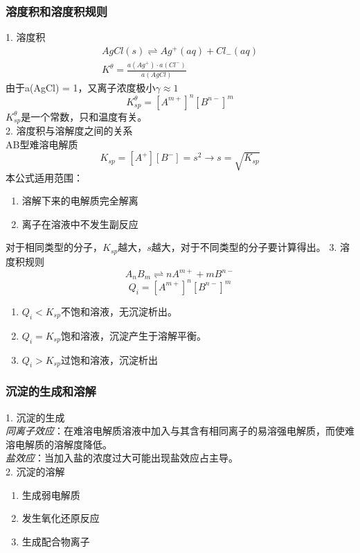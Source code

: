 \documentclass[utf8,a4paper,12pt]{ctexart}
\begin{document}
\subsubsection{溶度积和溶度积规则}
1. 溶度积\\
\begin{gather*}
AgCl(s)\rightleftharpoons Ag^{+}(aq) + Cl_{-}(aq)\\
K^{\theta} = \frac{a(Ag^{+})\cdot a(Cl^{-})}{a(AgCl)}
\end{gather*}
由于a(AgCl) = 1，又离子浓度极小$\gamma \approx 1$
\begin{equation}
K^{\theta}_{sp} = [A^{m+}]^{n}[B^{n-}]^{m}
\end{equation}
$K_{sp}^{\theta}$是一个常数，只和温度有关。\\
2. 溶度积与溶解度之间的关系\\
AB型难溶电解质\\
\[
K_{sp} = [A^{+}][B^{-}] = s^{2} \rightarrow s = \sqrt{K_{sp}}
\]
本公式适用范围：
\begin{enumerate}[1)]
\item 溶解下来的电解质完全解离
\item 离子在溶液中不发生副反应
\end{enumerate}
对于相同类型的分子，$K_{sp}$越大，$s$越大，对于不同类型的分子要计算得出。
3. 溶度积规则
\[
A_{n}B_{m}\rightleftharpoons nA^{m+} + mB^{n-}
\]
\begin{equation}
Q_{i} = [A^{m+}]^{n}[B^{n-}]^{m}
\end{equation}
\begin{enumerate}[(1)]
\item $Q_{i}<K_{sp}$不饱和溶液，无沉淀析出。
\item $Q_{i}=K_{sp}$饱和溶液，沉淀产生于溶解平衡。
\item $Q_{i}>K_{sp}$过饱和溶液，沉淀析出
\end{enumerate}
\subsubsection{沉淀的生成和溶解}
1. 沉淀的生成\\
\emph{同离子效应}：在难溶电解质溶液中加入与其含有相同离子的易溶强电解质，而使难溶电解质的溶解度降低。\\
\emph{盐效应}：当加入盐的浓度过大可能出现盐效应占主导。\\
2. 沉淀的溶解
\begin{enumerate}[(1)]
\item 生成弱电解质
\item 发生氧化还原反应
\item 生成配合物离子 
\end{enumerate}
\end{document}
